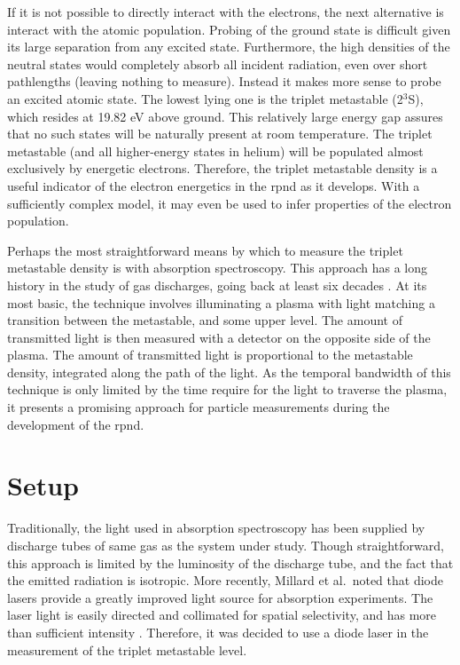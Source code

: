 If it is not possible to directly interact with the electrons, the next
alternative is interact with the atomic population. Probing of the ground state
is difficult given its large separation from any excited state. Furthermore, the
high densities of the neutral states would completely absorb all incident
radiation, even over short pathlengths (leaving nothing to measure). Instead it
makes more sense to probe an excited atomic state. The lowest lying one is the
triplet metastable (2$^3$S), which resides at 19.82 eV above ground. This
relatively large energy gap assures that no such states will be naturally
present at room temperature. The triplet metastable (and all higher-energy
states in helium) will be populated almost exclusively by energetic electrons.
Therefore, the triplet metastable density is a useful indicator of the electron
energetics in the \acs{rpnd} as it develops. With a sufficiently complex model,
it may even be used to infer properties of the electron population.

Perhaps the most straightforward means by which to measure the triplet
metastable density is with absorption spectroscopy. This approach has a long
history in the study of gas discharges, going back at least six decades
\cite{Phelps1953}. At its most basic, the technique involves illuminating a
plasma with light matching a transition between the metastable, and some upper
level. The amount of transmitted light is then measured with a detector on the
opposite side of the plasma. The amount of transmitted light is proportional to
the metastable density, integrated along the path of the light. As the temporal
bandwidth of this technique is only limited by the time require for the light to
traverse the plasma, it presents a promising approach for particle measurements
during the development of the \acs{rpnd}.

\section{Setup}

Traditionally, the light used in absorption spectroscopy has been supplied by
discharge tubes of same gas as the system under study. Though straightforward,
this approach is limited by the luminosity of the discharge tube, and the fact
that the emitted radiation is isotropic. More recently, Millard et al.\ noted
that diode lasers provide a greatly improved light source for absorption
experiments. The laser light is easily directed and collimated for spatial
selectivity, and has more than sufficient intensity \cite{Millard1998}.
Therefore, it was decided to use a diode laser in the measurement of the triplet
metastable level.

